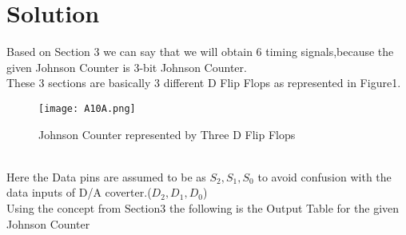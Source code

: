 \documentclass{article}
\begin{document}
\section {Solution}
Based on Section 3 we can say that we will obtain 6 timing signals,because the given Johnson Counter is 3-bit Johnson Counter.\\
These 3 sections are basically 3 different D Flip Flops as represented in Figure1.\\
\begin{figure}[htp]
    \centering
     \texttt{[image: A10A.png]}
     \caption{Johnson Counter represented by Three D Flip Flops}
\end{figure}\\
Here the Data pins are assumed to be as $S_2,S_1,S_0$ to avoid confusion with the data inputs of D/A coverter.($D_2,D_1,D_0$)\\
Using the concept from Section3 the following is the Output Table for the given Johnson Counter\\\\
\end{document}

